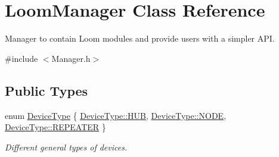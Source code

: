 \hypertarget{class_loom_manager}{}\section{Loom\+Manager Class Reference}
\label{class_loom_manager}


Manager to contain Loom modules and provide users with a simpler A\+PI.  




{\ttfamily \#include $<$Manager.\+h$>$}

\subsection*{Public Types}
\begin{DoxyCompactItemize}
\item 
enum \hyperlink{class_loom_manager_a23170d165993ad196a7604fd08b29400}{Device\+Type} \{ \hyperlink{class_loom_manager_a23170d165993ad196a7604fd08b29400a3cc0a3bb62454e5f6414c7adb897b5ff}{Device\+Type\+::\+H\+UB}, 
\hyperlink{class_loom_manager_a23170d165993ad196a7604fd08b29400a0cc25b606fe928a0c9a58f7f209c4495}{Device\+Type\+::\+N\+O\+DE}, 
\hyperlink{class_loom_manager_a23170d165993ad196a7604fd08b29400ad31b9025a6321e1dddf76266123d7e99}{Device\+Type\+::\+R\+E\+P\+E\+A\+T\+ER}
 \}\begin{DoxyCompactList}\small\item\em Different general types of devices. \end{DoxyCompactList}
\end{DoxyCompactItemize}
